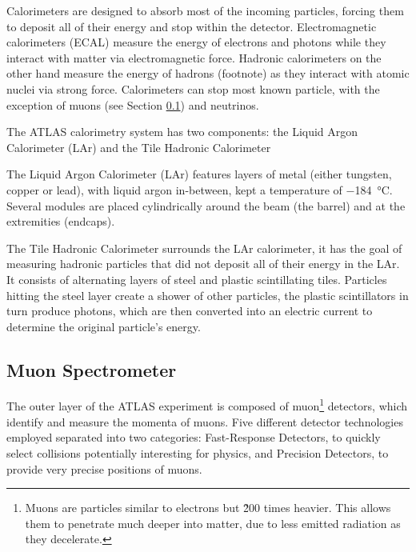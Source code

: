 Calorimeters are designed to absorb most of the incoming particles, forcing them to deposit all of their energy and stop within the detector. Electromagnetic calorimeters (ECAL) measure the energy of electrons and photons while they interact with matter via electromagnetic force. Hadronic calorimeters on the other hand measure the energy of hadrons (footnote) as they interact with atomic nuclei via strong force. Calorimeters can stop most known particle, with the exception of muons (see Section \ref{sec:muon_spectrometer}) and neutrinos.

The ATLAS calorimetry system has two components: the Liquid Argon Calorimeter (LAr) and the Tile Hadronic Calorimeter

The Liquid Argon Calorimeter (LAr) features layers of metal (either tungsten, copper or lead), with liquid argon in-between, kept a temperature of \qty{-184}{\degreeCelsius}. Several modules are placed cylindrically around the beam (the barrel) and at the extremities (endcaps).

The Tile Hadronic Calorimeter surrounds the LAr calorimeter, it has the goal of measuring hadronic particles that did not deposit all of their energy in the LAr. It consists of alternating layers of steel and plastic scintillating tiles. Particles hitting the steel layer create a shower of other particles, the plastic scintillators in turn produce photons, which are then converted into an electric current to determine the original particle's energy.


\subsection{Muon Spectrometer}\label{sec:muon_spectrometer}

The outer layer of the ATLAS experiment is composed of muon\footnote{Muons are particles similar to electrons but \~200 times heavier. This allows them to penetrate much deeper into matter, due to less emitted radiation as they decelerate.} detectors, which identify and measure the momenta of muons. Five different detector technologies employed separated into two categories: Fast-Response Detectors, to quickly select collisions potentially interesting for physics, and Precision Detectors, to provide very precise positions of muons.

